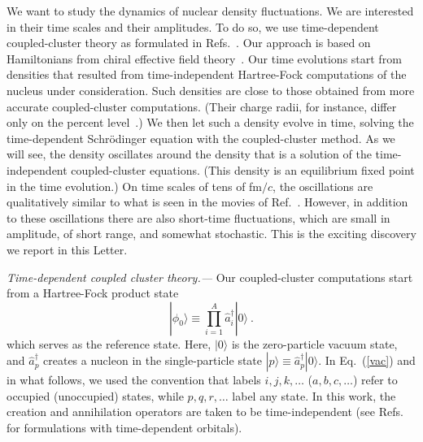 \documentclass[aps,prc,twocolumn,showpacs,floatfix,nofootinbib,superscriptaddress,amsmath,amssymb,longbibliography,amsproc]{revtex4-2}
\begin{document}
We want to study the dynamics of nuclear density fluctuations. We are interested in their time scales and their amplitudes.
To do so, we use  time-dependent coupled-cluster theory as formulated in Refs.~\cite{kvaal2012,pigg2012}.
Our approach is based on Hamiltonians from chiral effective field theory~\cite{epelbaum2009,machleidt2011,hebeler2011,hammer2020}.  Our time evolutions start from densities that resulted from  time-independent Hartree-Fock computations of the nucleus under consideration. Such densities are close to those obtained from more accurate coupled-cluster computations. (Their charge radii, for instance, differ only on the percent level~\cite{koszorus2021,companys2025}.) We then let such a density evolve in time, solving the time-dependent Schr\"odinger equation with the coupled-cluster method. As we will see, the density oscillates around the density that is a solution of the time-independent coupled-cluster equations. (This density is an equilibrium fixed point in the time evolution.) On time scales of tens of fm$/c$, the oscillations are qualitatively similar to what is seen in the movies of Ref.~\cite{sekizawa2016}. However, in addition to these oscillations there are also short-time fluctuations, which are small in amplitude, of short range, and somewhat stochastic. This is the exciting discovery we report in this Letter.


\textit{Time-dependent coupled cluster theory.---}
Our coupled-cluster computations start from a Hartree-Fock product state
\begin{equation}
\label{vac}
    |\phi_0\rangle \equiv \prod_{i=1}^A \hat{a}^\dagger_i|0\rangle \ .
\end{equation}
which serves as the reference state.
Here, $|0\rangle$ is the zero-particle vacuum state, and $\hat{a}_p^\dagger$ creates a nucleon in the single-particle state $|p\rangle\equiv\hat{a}_p^\dagger|0\rangle$. In Eq.~(\ref{vac}) and in what follows, we used the convention that labels $i,j,k,\ldots$ ($a,b,c,\ldots$) refer to occupied (unoccupied) states, while $p,q,r,\ldots$ label any state.
In this work, the creation and annihilation operators are taken to be time-independent (see Refs.~\cite{kvaal2012,pigg2012,sverdrupofstad2020} for formulations with time-dependent orbitals).
\end{document}
